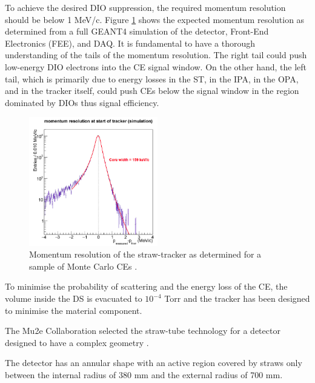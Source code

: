 To achieve the desired DIO suppression, the required momentum resolution should be below 1 MeV/c.  
Figure \ref{fig:trkres} shows the expected momentum resolution as determined 
from a full GEANT4 simulation of the detector, Front-End Electronics (FEE), and  DAQ.
It is fundamental to have a thorough understanding of the tails of the momentum resolution. 
The right tail could push low-energy DIO electrons into the CE signal window. 
On the other hand, the left tail, which is primarily due to energy losses in the ST, 
in the IPA, in the OPA, and in the tracker itself, could 
push CEs below the signal window in the region dominated by DIOs 
thus  signal efficiency.
\begin{figure}[!h]
    \centering
    \includegraphics[width =0.5\textwidth]{figures/png/Screenshot_20240330_104830.png}
    \caption[The momentum resolution of the straw-tracker.]{Momentum resolution of the straw-tracker as determined for 
    a sample of Monte Carlo CEs \cite{bobbb}.}
    \label{fig:trkres}
    \end{figure} 
To minimise the probability of scattering and the energy loss of the CE, 
the volume inside the DS is evacuated to $10^{-4}$ Torr 
and the tracker has been designed {\red to minimise the material component. }

The Mu2e Collaboration selected the straw-tube technology {\red for a detector 
designed to have a complex geometry} \cite{bobbb}.

The detector has an annular shape with an active region covered by straws only between the 
internal radius of 380 mm and the external radius of 700 mm.  

